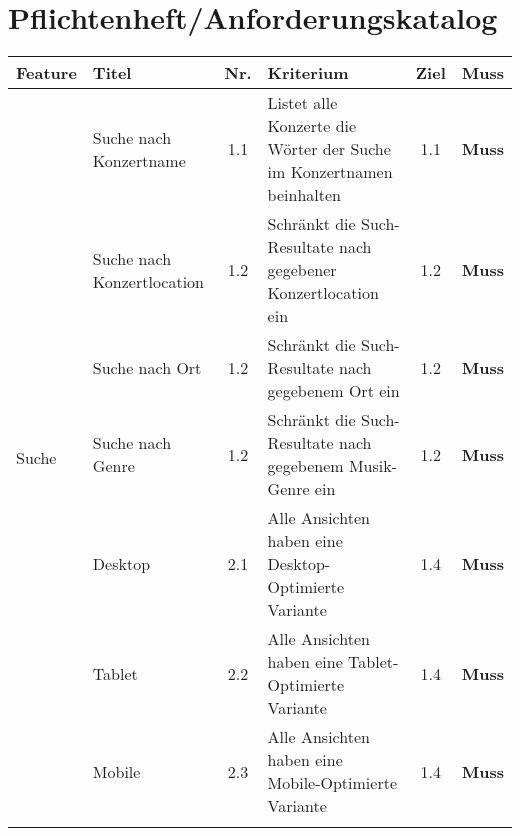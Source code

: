 \clearpage
\section{Pflichtenheft/Anforderungskatalog}\label{pflichtenheftanforderungskatalog}

\begin{longtable}[]{@{}p{1.9cm}p{2.5cm}cp{5.5cm}cc@{}}
  \toprule
  \textbf{Feature}           & \textbf{Titel}             & \textbf{Nr.} & \textbf{Kriterium}                                                                                          & \textbf{Ziel} & \textbf{Muss}\tabularnewline
  \midrule
  \endhead
  \multirow{10}{*}{Suche}    & Suche nach Konzertname     & 1.1          & Listet alle Konzerte die Wörter der Suche im Konzertnamen beinhalten                                        & 1.1           & \textbf{Muss}                \\ \cline{2-6}
                             & Suche nach Konzertlocation & 1.2          & Schränkt die Such-Resultate nach gegebener Konzertlocation ein                                              & 1.2           & \textbf{Muss}                \\ \cline{2-6}
                             & Suche nach Ort             & 1.2          & Schränkt die Such-Resultate nach gegebenem Ort ein                                                          & 1.2           & \textbf{Muss}                \\ \cline{2-6}
                             & Suche nach Genre           & 1.2          & Schränkt die Such-Resultate nach gegebenem Musik-Genre ein                                                  & 1.2           & \textbf{Muss}                \\
  \midrule
  \multirow{8}{*}{Design}    & Desktop                    & 2.1          & Alle Ansichten haben eine Desktop-Optimierte Variante                                                       & 1.4           & \textbf{Muss}                \\ \cline{2-6}
                             & Tablet                     & 2.2          & Alle Ansichten haben eine Tablet-Optimierte Variante                                                        & 1.4           & \textbf{Muss}                \\ \cline{2-6}
                             & Mobile                     & 2.3          & Alle Ansichten haben eine Mobile-Optimierte Variante                                                        & 1.4           & \textbf{Muss}                \\ \cline{2-6}

\end{longtable}
